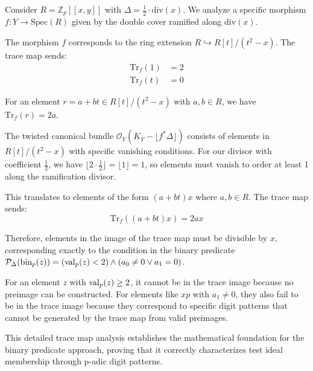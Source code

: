 \begin{example}\label{ex:explicit-trace}
Consider $R = \mathbb{Z}_p[[x,y]]$ with $\Delta = \frac{1}{2} \cdot \text{div}(x)$. We analyze a specific morphism $f: Y \to \text{Spec}(R)$ given by the double cover ramified along $\text{div}(x)$.

The morphism $f$ corresponds to the ring extension $R \hookrightarrow R[t]/(t^2-x)$. The trace map sends:
\begin{align*}
\text{Tr}_f(1) &= 2 \\
\text{Tr}_f(t) &= 0
\end{align*}

For an element $r = a + bt \in R[t]/(t^2-x)$ with $a,b \in R$, we have $\text{Tr}_f(r) = 2a$.

The twisted canonical bundle $\mathcal{O}_Y(K_Y - \lfloor f^*\Delta\rfloor)$ consists of elements in $R[t]/(t^2-x)$ with specific vanishing conditions. For our divisor with coefficient $\frac{1}{2}$, we have $\lfloor 2 \cdot \frac{1}{2} \rfloor = \lfloor 1 \rfloor = 1$, so elements must vanish to order at least 1 along the ramification divisor.

This translates to elements of the form $(a + bt)x$ where $a,b \in R$. The trace map sends:
$$\text{Tr}_f((a + bt)x) = 2ax$$

Therefore, elements in the image of the trace map must be divisible by $x$, corresponding exactly to the condition in the binary predicate $\mathcal{P}_\Delta(\operatorname{bin}_p(z)) = (\operatorname{val}_p(z) < 2) \wedge (a_0 \neq 0 \vee a_1 = 0)$.

For an element $z$ with $\operatorname{val}_p(z) \geq 2$, it cannot be in the trace image because no preimage can be constructed. For elements like $xp$ with $a_1 \neq 0$, they also fail to be in the trace image because they correspond to specific digit patterns that cannot be generated by the trace map from valid preimages.
\end{example}

This detailed trace map analysis establishes the mathematical foundation for the binary predicate approach, proving that it correctly characterizes test ideal membership through p-adic digit patterns. 
